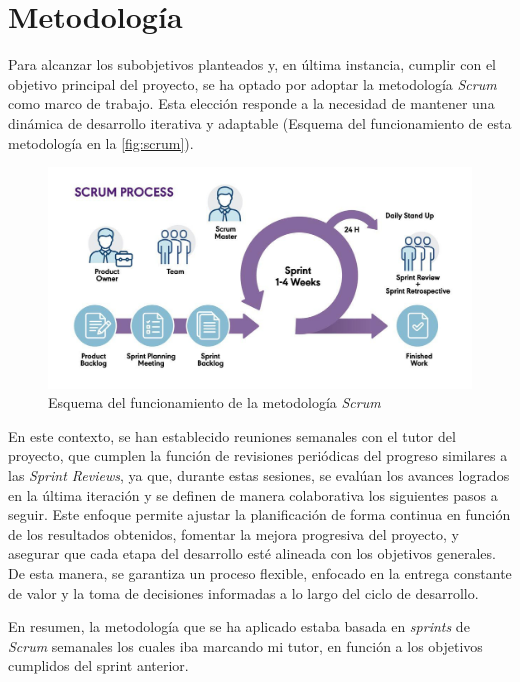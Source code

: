 \section{Metodología}

Para alcanzar los subobjetivos planteados y, en última instancia, cumplir con el objetivo principal del proyecto, se ha optado por adoptar la metodología \textit{Scrum} como marco de trabajo. Esta elección responde a la necesidad de mantener una dinámica de desarrollo iterativa y adaptable (Esquema del funcionamiento de esta metodología en la \autoref{fig:scrum}). 

\begin{figure}[H]
    \centering
    \includegraphics[width=1\textwidth]{figures/cap_2/scrum.jpg}
    \caption{Esquema del funcionamiento de la metodología \textit{Scrum}}
    \label{fig:scrum}
\end{figure}

En este contexto, se han establecido reuniones semanales con el tutor del proyecto, que cumplen la función de revisiones periódicas del progreso similares a las \textit{Sprint Reviews}, ya que, durante estas sesiones, se evalúan los avances logrados en la última iteración y se definen de manera colaborativa los siguientes pasos a seguir. Este enfoque permite ajustar la planificación de forma continua en función de los resultados obtenidos, fomentar la mejora progresiva del proyecto, y asegurar que cada etapa del desarrollo esté alineada con los objetivos generales. De esta manera, se garantiza un proceso flexible, enfocado en la entrega constante de valor y la toma de decisiones informadas a lo largo del ciclo de desarrollo.

En resumen, la metodología que se ha aplicado estaba basada en \textit{sprints} de \textit{Scrum} semanales los cuales iba marcando mi tutor, en función a los objetivos cumplidos del sprint anterior.


